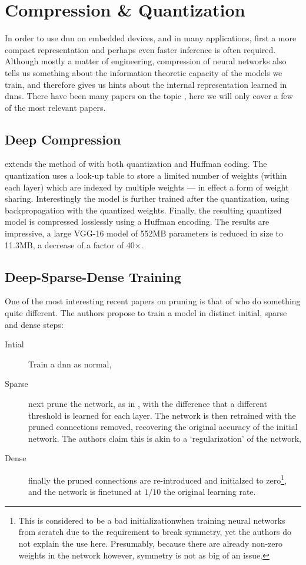 \documentclass[thesis]{subfiles}
\begin{document}
	\section{Compression \& Quantization}
	In order to use \gls{dnn} on embedded devices, and in many applications, first a more compact representation and perhaps even faster inference is often required. Although mostly a matter of engineering, compression of neural networks also tells us something about the information theoretic capacity of the models we train, and therefore gives us hints about the internal representation learned in \glspl{dnn}. There have been many papers on the topic \citep{han2015deep,han2015learning,han2016dsd,Kim2016,rastegari2016xnor,ullrich2017soft}, here we will only cover a few of the most relevant papers.

	\subsection{Deep Compression}
	\citet{han2015deep} extends the method of \citet{han2015learning} with both quantization and Huffman coding. The quantization uses a look-up table to store a limited number of weights (within each layer) which are indexed by multiple weights --- in effect a form of weight sharing. Interestingly the model is further trained after the quantization, using backpropagation with the quantized weights. Finally, the resulting quantized model is compressed losslessly using a Huffman encoding. The results are impressive, a large VGG-16 model of 552MB parameters is reduced in size to 11.3MB, a decrease of a factor of 40$\times$.

	\subsection{Deep-Sparse-Dense Training}
	One of the most interesting recent papers on pruning is that of \citet{han2016dsd} who do something quite different. The authors propose to train a model in distinct initial, sparse and dense steps:
	\begin{description}
		\item[Intial] Train a \gls{dnn} as normal,
		\item[Sparse] next prune the network, as in \citet{han2015learning}, with the difference that a different threshold is learned for each layer. The network is then retrained with the pruned connections removed, recovering the original accuracy of the initial network. The authors claim this is akin to a `regularization' of the network,
		\item[Dense] finally the pruned connections are re-introduced and initialzed to zero\footnote{This is considered to be a bad initializationwhen training neural networks from scratch due to the requirement to break symmetry, yet the authors do not explain the use here. Presumably, because there are already non-zero weights in the network however, symmetry is not as big of an issue.}, and the network is \gls{finetuned} at $1/10$ the original learning rate.
	\end{description}
\end{document}
